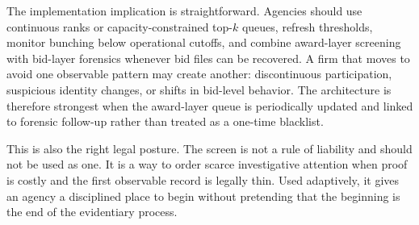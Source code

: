 The implementation implication is straightforward. Agencies
should use continuous ranks or capacity-constrained top-$k$
queues, refresh thresholds, monitor bunching below operational
cutoffs, and combine award-layer screening with bid-layer
forensics whenever bid files can be recovered. A firm that moves
to avoid one observable pattern may create another: discontinuous
participation, suspicious identity changes, or shifts in
bid-level behavior. The architecture is therefore strongest when
the award-layer queue is periodically updated and linked to
forensic follow-up rather than treated as a one-time blacklist.

This is also the right legal posture. The screen is not a rule of
liability and should not be used as one. It is a way to order
scarce investigative attention when proof is costly and the first
observable record is legally thin. Used adaptively, it gives an
agency a disciplined place to begin without pretending that the
beginning is the end of the evidentiary process.
